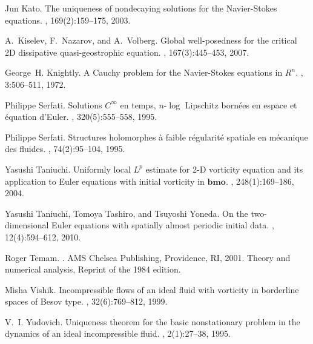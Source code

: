 \documentclass[reqno,openright,11pt,twoside]{amsart}
\theoremstyle{definition}
\numberwithin{equation}{section}
\begin{document}
\begin{thebibliography}{10}
Jun Kato.
\newblock The uniqueness of nondecaying solutions for the {N}avier-{S}tokes
  equations.
, 169(2):159--175, 2003.

A.~Kiselev, F.~Nazarov, and A.~Volberg.
\newblock Global well-posedness for the critical 2{D} dissipative
  quasi-geostrophic equation.
, 167(3):445--453, 2007.

George~H. Knightly.
\newblock A {C}auchy problem for the {N}avier-{S}tokes equations in {$R^{n}$}.
, 3:506--511, 1972.

Philippe Serfati.
\newblock Solutions {$C^\infty$} en temps, {$n$}-{$\log$} {L}ipschitz born\'ees
  en espace et \'equation d'{E}uler.
, 320(5):555--558, 1995.

Philippe Serfati.
\newblock Structures holomorphes \`a faible r\'egularit\'e spatiale en
  m\'ecanique des fluides.
, 74(2):95--104, 1995.

Yasushi Taniuchi.
\newblock Uniformly local {$L^p$} estimate for 2-{D} vorticity equation and its
  application to {E}uler equations with initial vorticity in {$\bm{bmo}$}.
, 248(1):169--186, 2004.

Yasushi Taniuchi, Tomoya Tashiro, and Tsuyoshi Yoneda.
\newblock On the two-dimensional {E}uler equations with spatially almost
  periodic initial data.
, 12(4):594--612, 2010.

Roger Temam.
.
\newblock AMS Chelsea Publishing, Providence, RI, 2001.
\newblock Theory and numerical analysis, Reprint of the 1984 edition.

Misha Vishik.
\newblock Incompressible flows of an ideal fluid with vorticity in borderline
  spaces of {B}esov type.
, 32(6):769--812, 1999.

V.~I. Yudovich.
\newblock Uniqueness theorem for the basic nonstationary problem in the
  dynamics of an ideal incompressible fluid.
, 2(1):27--38, 1995.

\end{thebibliography}
\end{document}
